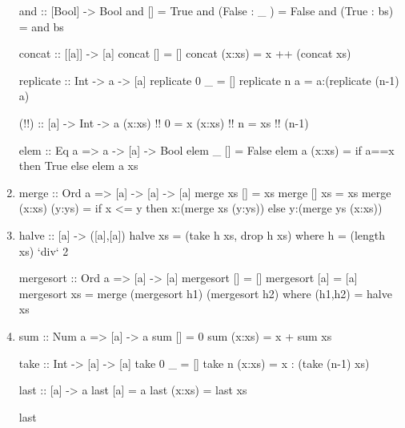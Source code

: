 \documentclass{article}
\begin{document}
\begin{enumerate}
\begin{code}
and :: [Bool] -> Bool
and [] = True
and (False : _ ) = False
and (True : bs) = and bs
\end{code}

\begin{code}
concat :: [[a]] -> [a]
concat [] = []
concat (x:xs) = x ++ (concat xs) 
\end{code}

\begin{code}
replicate :: Int -> a -> [a]
replicate 0 _ = []
replicate n a = a:(replicate (n-1) a)
\end{code}

\begin{code}
(!!) :: [a] -> Int -> a
(x:xs) !! 0 = x
(x:xs) !! n = xs !! (n-1)
\end{code}

\begin{code}
elem :: Eq a => a -> [a] -> Bool
elem _ [] = False
elem a (x:xs) = if a==x then True else elem a xs
\end{code}

\item 
\begin{code}
merge :: Ord a => [a] -> [a] -> [a]
merge xs [] = xs
merge [] xs = xs
merge (x:xs) (y:ys) = if x <= y then x:(merge xs (y:ys)) else y:(merge ys (x:xs))
\end{code}

\item
\begin{code}
halve :: [a] -> ([a],[a])
halve xs = (take h xs, drop h xs)
            where
                h = (length xs) `div` 2

mergesort :: Ord a => [a] -> [a]
mergesort []  = []
mergesort [a] = [a]
mergesort xs  = merge (mergesort h1) (mergesort h2) where (h1,h2) = halve xs
\end{code}

\item 
\begin{code}
sum :: Num a => [a] -> a
sum [] = 0
sum (x:xs) = x + sum xs
\end{code}

\begin{code}
take :: Int -> [a] -> [a]
take 0 _ = []
take n (x:xs) = x : (take (n-1) xs)
\end{code}

\begin{code}
last :: [a] -> a
last [a] = a
last (x:xs) = last xs
\end{code}

\item[last]


\end{enumerate}
\end{document}
